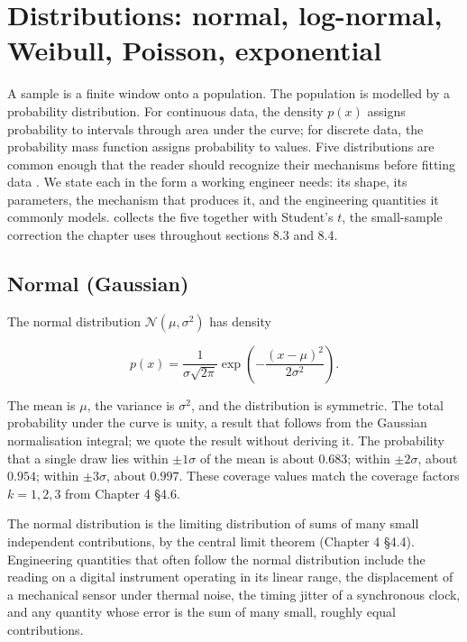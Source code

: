 \section{Distributions: normal, log-normal, Weibull, Poisson, exponential}

A sample is a finite window onto a population. The population is
modelled by a probability distribution. For continuous data, the
density $p(x)$ assigns probability to intervals through area under
the curve; for discrete data, the probability mass function assigns
probability to values. Five distributions are common enough that
the reader should recognize their mechanisms before fitting data
\cite[ch.~3-4]{text:devore2015}. We state each in the form a working
engineer needs: its shape, its parameters, the mechanism that
produces it, and the engineering quantities it commonly models.
 collects the five
together with Student's $t$, the small-sample correction the
chapter uses throughout sections 8.3 and 8.4.



\subsection{Normal (Gaussian)}

The normal distribution $\mathcal{N}(\mu, \sigma^{2})$ has density

\[
p(x) = \frac{1}{\sigma\sqrt{2\pi}} \exp\!\left(-\frac{(x - \mu)^{2}}
{2\sigma^{2}}\right).
\]

The mean is $\mu$, the variance is $\sigma^{2}$, and the
distribution is symmetric. The total probability under the curve is
unity, a result that follows from the Gaussian normalisation
integral; we quote the result without deriving it. The probability
that a single draw lies within $\pm 1\sigma$ of the mean is about
$0.683$; within $\pm 2\sigma$, about $0.954$; within $\pm 3\sigma$,
about $0.997$. These coverage values match the coverage factors
$k = 1, 2, 3$ from Chapter 4 §4.6.

The normal distribution is the limiting distribution of sums of many
small independent contributions, by the central limit theorem
(Chapter 4 §4.4). Engineering quantities that often follow the
normal distribution include the reading on a digital instrument
operating in its linear range, the displacement of a mechanical
sensor under thermal noise, the timing jitter of a synchronous
clock, and any quantity whose error is the sum of many small,
roughly equal contributions.

